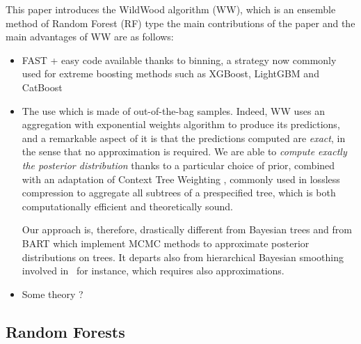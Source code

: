 \documentclass{article}
\begin{document}
This paper introduces the WildWood algorithm (WW), which is an ensemble method of Random Forest (RF) type  the main contributions of the paper and the main advantages of WW are as follows:
\begin{itemize}
  \item FAST + easy code available thanks to binning, a strategy now commonly used for extreme boosting methods such as XGBoost, LightGBM and CatBoost \cite{prokhorenkova2017catboost} 

  \item The use which is made of out-of-the-bag samples. Indeed, WW uses an aggregation with exponential weights algorithm to produce its predictions, and a remarkable aspect of it is that the predictions computed are  \emph{exact}, in the sense that no approximation is required.
  We are able to \emph{compute exactly the posterior distribution} thanks to a particular choice of prior, combined with an adaptation of Context Tree Weighting \cite{willems1995context-basic,willems1998context-extensions,helmbold1997pruning,catoni2004statistical}, commonly used in lossless compression to aggregate all subtrees of a prespecified tree, which is both computationally efficient and theoretically sound.

 Our approach is, therefore, drastically
  different from Bayesian trees \cite{chipman1998bayesiancart,denison1998bayesiancart,taddy2011dynamictrees} and from BART \cite{chipman2010bart} which implement MCMC methods to approximate posterior distributions on trees. It departs also from hierarchical Bayesian smoothing involved in~\cite{lakshminarayanan2014mondrianforests} for instance, which requires also approximations.

  \item Some theory ?
\end{itemize}


\subsection{Random Forests}
 
\end{document}
